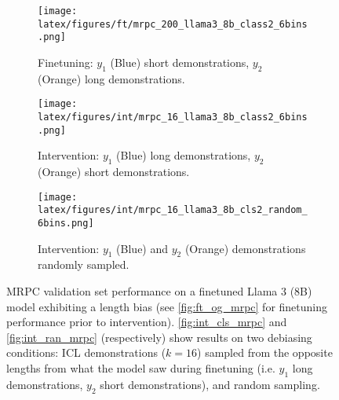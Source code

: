 \begin{figure*}[t!]
    \centering
    \begin{minipage}[t]{\linewidth}
        \begin{subfigure}{0.31\linewidth}
            \centering
            \texttt{[image: latex/figures/ft/mrpc\_200\_llama3\_8b\_class2\_6bins.png]}
            \caption{Finetuning: $y_1$ (Blue) short demonstrations, $y_2$ (Orange) long demonstrations.}\label{fig:ft_og_mrpc}
        \end{subfigure}%
        \hfill
        \begin{subfigure}{0.31\linewidth}
            \centering
            \texttt{[image: latex/figures/int/mrpc\_16\_llama3\_8b\_class2\_6bins.png]}
            \caption{Intervention: $y_1$ (Blue) long demonstrations, $y_2$ (Orange) short demonstrations.}\label{fig:int_cls_mrpc}
        \end{subfigure}
        \hfill
        \begin{subfigure}{0.31\linewidth}
            \centering
            \texttt{[image: latex/figures/int/mrpc\_16\_llama3\_8b\_cls2\_random\_6bins.png]}
            \caption{Intervention: $y_1$ (Blue) and $y_2$ (Orange) demonstrations randomly sampled.}\label{fig:int_ran_mrpc}
        \end{subfigure}
    \end{minipage}%
    \hfill
    \begin{minipage}[c]{\linewidth}
        \caption{\label{fig:int-hans} MRPC validation set performance on a finetuned Llama 3 (8B) model exhibiting a length bias (see \autoref{fig:ft_og_mrpc} for finetuning performance prior to intervention). \autoref{fig:int_cls_mrpc} and \autoref{fig:int_ran_mrpc} (respectively) show results on two debiasing conditions: ICL demonstrations ($k=16$) sampled from the opposite lengths from what the model saw during finetuning (i.e. $y_1$ long demonstrations, $y_2$ short demonstrations), and random sampling.}
    \end{minipage}
\end{figure*}
